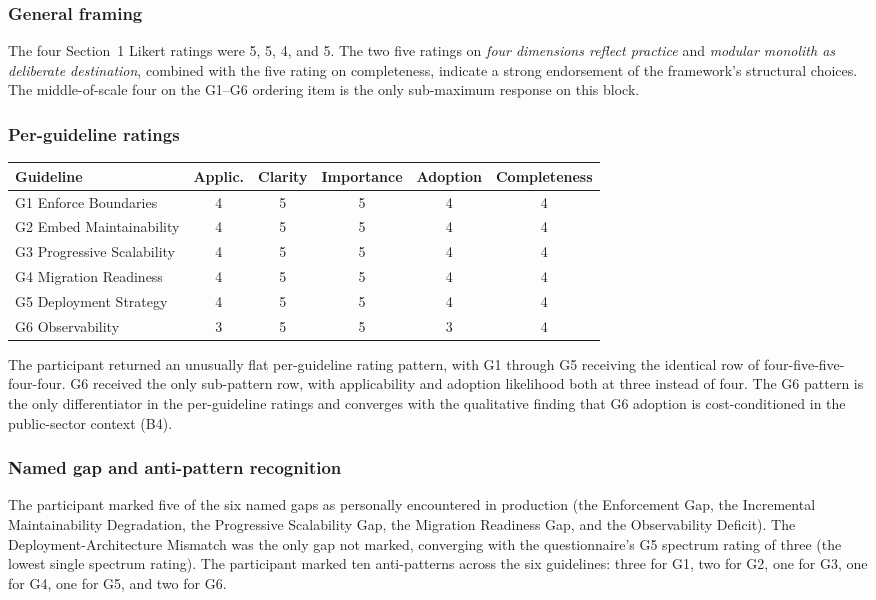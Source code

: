 \subsubsection*{General framing}

The four Section~1 Likert ratings were 5, 5, 4, and 5. The two five ratings on \emph{four dimensions reflect practice} and \emph{modular monolith as deliberate destination}, combined with the five rating on completeness, indicate a strong endorsement of the framework's structural choices. The middle-of-scale four on the G1--G6 ordering item is the only sub-maximum response on this block.

\subsubsection*{Per-guideline ratings}

\begin{longtable}{p{2.5cm} c c c c c}
\toprule
\textbf{Guideline} & \textbf{Applic.} & \textbf{Clarity} & \textbf{Importance} & \textbf{Adoption} & \textbf{Completeness} \\
\midrule
\endhead
G1 Enforce Boundaries & 4 & 5 & 5 & 4 & 4 \\
G2 Embed Maintainability & 4 & 5 & 5 & 4 & 4 \\
G3 Progressive Scalability & 4 & 5 & 5 & 4 & 4 \\
G4 Migration Readiness & 4 & 5 & 5 & 4 & 4 \\
G5 Deployment Strategy & 4 & 5 & 5 & 4 & 4 \\
G6 Observability & 3 & 5 & 5 & 3 & 4 \\
\bottomrule
\end{longtable}

\noindent
The participant returned an unusually flat per-guideline rating pattern, with G1 through G5 receiving the identical row of four-five-five-four-four. G6 received the only sub-pattern row, with applicability and adoption likelihood both at three instead of four. The G6 pattern is the only differentiator in the per-guideline ratings and converges with the qualitative finding that G6 adoption is cost-conditioned in the public-sector context (B4).

\subsubsection*{Named gap and anti-pattern recognition}

The participant marked five of the six named gaps as personally encountered in production (the Enforcement Gap, the Incremental Maintainability Degradation, the Progressive Scalability Gap, the Migration Readiness Gap, and the Observability Deficit). The Deployment-Architecture Mismatch was the only gap not marked, converging with the questionnaire's G5 spectrum rating of three (the lowest single spectrum rating). The participant marked ten anti-patterns across the six guidelines: three for G1, two for G2, one for G3, one for G4, one for G5, and two for G6.

